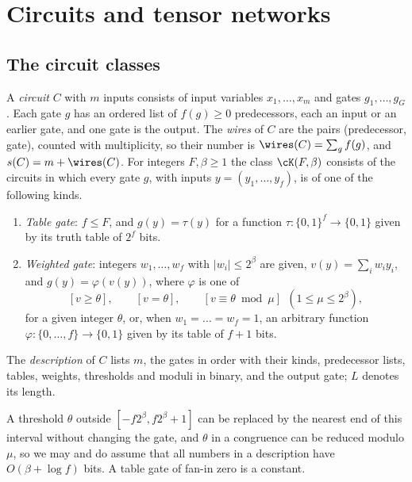 
\section{Circuits and tensor networks}\label{sec:networks}

\subsection{The circuit classes}
\begin{definition}\label{def:gates}
A \emph{circuit} $C$ with $m$ inputs consists of input variables
$x_1,\dots,x_m$ and gates $g_1,\dots,g_G$. Each gate $g$ has an ordered list of
$f(g)\ge0$ predecessors, each an input or an earlier gate, and one gate is the
output. The \emph{wires} of $C$ are the pairs (predecessor, gate), counted with
multiplicity, so their number is $\wires(C)=\sum_gf(g)$, and $s(C)=m+\wires(C)$.
For integers $F,\beta\ge1$ the class $\cK(F,\beta)$ consists of the circuits in
which every gate $g$, with inputs $y=(y_1,\dots,y_f)$, is of one of the
following kinds.
\begin{enumerate}[label=\textup{(\alph*)},leftmargin=2.2em]
\item \emph{Table gate}: $f\le F$, and $g(y)=\tau(y)$ for a function
$\tau:\{0,1\}^f\to\{0,1\}$ given by its truth table of $2^f$ bits.
\item \emph{Weighted gate}: integers $w_1,\dots,w_f$ with $|w_i|\le2^\beta$ are
given, $v(y)=\sum_iw_iy_i$, and $g(y)=\varphi(v(y))$, where $\varphi$ is one of
\[
[v\ge\theta],\qquad [v=\theta],\qquad [v\equiv\theta\bmod\mu]\ \ (1\le\mu\le2^\beta),
\]
for a given integer $\theta$, or, when $w_1=\dots=w_f=1$, an arbitrary function
$\varphi:\{0,\dots,f\}\to\{0,1\}$ given by its table of $f+1$ bits.
\end{enumerate}
The \emph{description} of $C$ lists $m$, the gates in order with their kinds,
predecessor lists, tables, weights, thresholds and moduli in binary, and the
output gate; $L$ denotes its length.
\end{definition}

A threshold $\theta$ outside $[-f2^\beta,f2^\beta+1]$ can be replaced by the
nearest end of this interval without changing the gate, and $\theta$ in a
congruence can be reduced modulo $\mu$, so we may and do assume that all
numbers in a description have $O(\beta+\log f)$ bits. A table gate of fan-in
zero is a constant.

